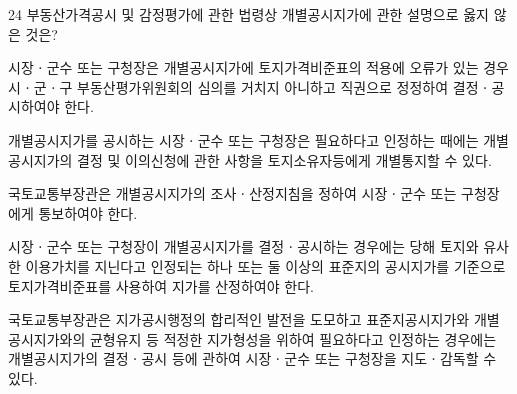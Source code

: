 \begin{question}{24}
부동산가격공시 및 감정평가에 관한 법령상 개별공시지가에 관한 설명으로 옳지 않은 것은?
\begin{choices}
  \item 시장ㆍ군수 또는 구청장은 개별공시지가에 토지가격비준표의 적용에 오류가 있는 경우 시ㆍ군ㆍ구 부동산평가위원회의 심의를 거치지 아니하고 직권으로 정정하여 결정ㆍ공시하여야 한다.
  \item 개별공시지가를 공시하는 시장ㆍ군수 또는 구청장은 필요하다고 인정하는 때에는 개별공시지가의 결정 및 이의신청에 관한 사항을 토지소유자등에게 개별통지할 수 있다.
  \item 국토교통부장관은 개별공시지가의 조사ㆍ산정지침을 정하여 시장ㆍ군수 또는 구청장에게 통보하여야 한다.
  \item 시장ㆍ군수 또는 구청장이 개별공시지가를 결정ㆍ공시하는 경우에는 당해 토지와 유사한 이용가치를 지닌다고 인정되는 하나 또는 둘 이상의 표준지의 공시지가를 기준으로 토지가격비준표를 사용하여 지가를 산정하여야 한다.
  \item 국토교통부장관은 지가공시행정의 합리적인 발전을 도모하고 표준지공시지가와 개별공시지가와의 균형유지 등 적정한 지가형성을 위하여 필요하다고 인정하는 경우에는 개별공시지가의 결정ㆍ공시 등에 관하여 시장ㆍ군수 또는 구청장을 지도ㆍ감독할 수 있다.
\end{choices}
\end{question}
